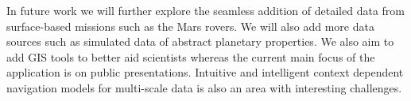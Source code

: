 \documentclass[journal]{vgtc}                %
\begin{document}
In future work we will further explore the seamless addition of detailed data from surface-based missions such as the Mars rovers. We will also add more data sources such as simulated data of abstract planetary properties.
We also aim to add GIS tools to better aid scientists whereas the current main focus of the application is on public presentations.
Intuitive and intelligent context dependent navigation models for multi-scale data is also an area with interesting challenges. 


%

%
%
%


\end{document}
